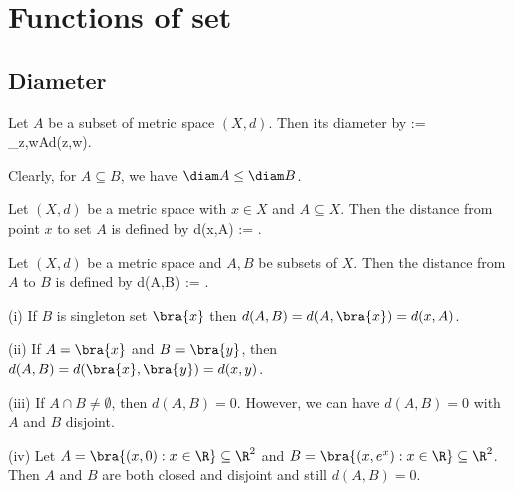


\section{Functions of set}

\subsection{Diameter}

\begin{definition}[diameter]
Let $A$ be a subset of metric space $(X,d)$. Then its diameter by
\be
\diam{} := \sup_{z,w\in A}d(z,w).
\ee
\end{definition}


\begin{remark}
Clearly, for $A\subseteq B$, we have $\diam A \leq \diam B$.
\end{remark}


\begin{definition}
Let $(X,d)$ be a metric space with $x\in X$ and $A\subseteq X$. Then the distance from point $x$ to set $A$ is defined by
\be
d(x,A) := \inf{}.
\ee
\end{definition}


\begin{definition}
Let $(X,d)$ be a metric space and $A,B$ be subsets of $X$. Then the distance from $A$ to $B$ is defined by
\be
d(A,B) := \inf{}.
\ee
\end{definition}

\begin{example}
\ben
\item [(i)] If $B$ is singleton set $\bra{x}$ then $d(A,B) = d(A,\bra{x}) = d(x,A)$.
\item [(ii)] If $A = \bra{x}$ and $B= \bra{y}$, then $d(A,B) = d(\bra{x},\bra{y}) = d(x,y)$.
\item [(iii)] If $A\cap B \neq \emptyset$, then $d(A,B) = 0$. However, we can have $d(A,B) = 0$ with $A$ and $B$ disjoint.
\item [(iv)] Let $A = \bra{(x,0):x\in \R}\subseteq \R^2$ and $B = \bra{(x,e^x):x\in \R} \subseteq \R^2$. Then $A$ and $B$ are both closed and disjoint and still $d(A,B) = 0$.
\een
\end{example}

